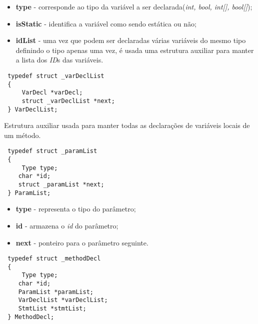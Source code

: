 \documentclass[11pt,a4paper]{article}
\begin{document}
\vspace{0.3cm}

\begin{itemize}
    \item \textbf{type} - corresponde ao tipo da variável a ser declarada(\textit{int, bool, int[], bool[]});
    
    \item \textbf{isStatic} - identifica a variável como sendo estática ou não;
    
    \item \textbf{idList} - uma vez que podem ser declaradas várias variáveis do mesmo tipo definindo o tipo apenas uma vez, é usada uma estrutura auxiliar para manter a lista dos \textit{ID}s das variáveis.
\end{itemize}

\begin{lstlisting}
 typedef struct _varDeclList
 {
  	 VarDecl *varDecl;
	 struct _varDeclList *next; 
 } VarDeclList;
\end{lstlisting}

Estrutura auxiliar usada para manter todas as declarações de variáveis locais de um método.

\vspace{0.3cm}

\begin{lstlisting}
 typedef struct _paramList
 {
     Type type;
 	char *id;
 	struct _paramList *next;
 } ParamList;
\end{lstlisting}

\vspace{0.3cm}

\begin{itemize}
    \item \textbf{type} - representa o tipo do parâmetro;
    \item \textbf{id} - armazena o \textit{id} do parâmetro;
    \item \textbf{next} - ponteiro para o parâmetro seguinte.
\end{itemize}

\begin{lstlisting}
 typedef struct _methodDecl
 {
     Type type;
 	char *id;
 	ParamList *paramList;
 	VarDeclList *varDeclList;
 	StmtList *stmtList;
 } MethodDecl;
\end{lstlisting}

\vspace{0.3cm}
\end{document}
